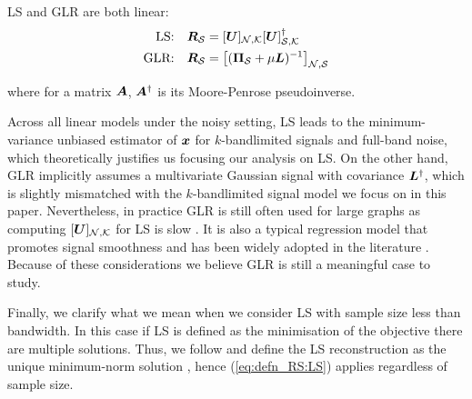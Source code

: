 \begin{remark}
    LS and GLR are both linear:
    \begin{align}
    \textrm{LS:\quad} \matr{R}_{\set{S}} &= \matrsubU{N}\matrsubU{S}^{\dagger} \label{eq:defn_RS:LS}\\
    \textrm{GLR:\quad} \matr{R}_{\set{S}} &= \msub[N,S]{( \proj{S} + \mu \matr{L})^{-1}} \label{eq:defn_RS:GLR}
    \end{align}
\end{remark}
\noindent where for a matrix $\bm{A}$, $\bm{A}^{\dagger}$ is its Moore-Penrose pseudoinverse.

Across all linear models under the noisy setting, LS leads to the minimum-variance unbiased estimator of $\bm{x}$ \cite{gauss1823theoria} {\color{black} for $k$-bandlimited signals and full-band noise}, which theoretically justifies us focusing our analysis on LS. 
On the other hand, GLR implicitly assumes a multivariate Gaussian signal with covariance $\bm{L}^{\dagger}$\cite{dong2016learning}, which is slightly mismatched with the $k$-bandlimited signal model we focus on in this paper. Nevertheless, in practice GLR is still often used for large graphs as computing $\matrsubU{N}$ for LS is slow \cite{puy2018random, bai2020fast}. It is also a typical regression model that promotes signal smoothness and has been widely adopted in the literature \cite{belkin2004semi}. Because of these considerations we believe GLR is still a meaningful case to study.

Finally, we clarify what we mean when we consider LS with sample size less than bandwidth. {\color{black} In this case }if LS is defined as the minimisation of the objective \bs{(\ref{eq:LS_Defn})} there are multiple solutions. Thus, we follow \cite{anis2016efficient} and define the LS reconstruction as the 
unique minimum-norm solution \cite[Sect. 5.5.1]{golub13}, hence (\ref{eq:defn_RS:LS}) applies regardless of sample size. 


